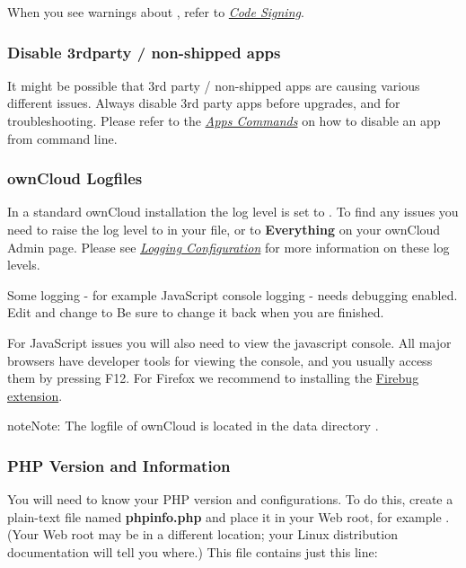 \documentclass[letterpaper,10pt,english]{sphinxmanual}
\begin{document}
When you see warnings about , refer to {\hyperref[issues/code_signing::doc]{\emph{Code Signing}}}.


\subsubsection{Disable 3rdparty / non-shipped apps}
\label{issues/general_troubleshooting:disable-3rdparty-non-shipped-apps}
It might be possible that 3rd party / non-shipped apps are causing various
different issues. Always disable 3rd party apps before upgrades, and for
troubleshooting. Please refer to the {\hyperref[configuration_server/occ_command:apps-commands-label]{\emph{Apps Commands}}} on how
to disable an app from command line.


\subsubsection{ownCloud Logfiles}
\label{issues/general_troubleshooting:owncloud-logfiles}
In a standard ownCloud installation the log level is set to . To find
any issues you need to raise the log level to  in your 
file, or to \textbf{Everything} on your ownCloud Admin page. Please see
{\hyperref[configuration_server/logging_configuration::doc]{\emph{Logging Configuration}}} for more information on
these log levels.

Some logging - for example JavaScript console logging - needs debugging
enabled. Edit  and change  to
 Be sure to change it back when you are finished.

For JavaScript issues you will also need to view the javascript console. All
major browsers have developer tools for viewing the console, and you
usually access them by pressing F12. For Firefox we recommend to installing
the \href{https://getfirebug.com/}{Firebug extension}.

\begin{notice}{note}{Note:}
The logfile of ownCloud is located in the data directory
.
\end{notice}


\subsubsection{PHP Version and Information}
\label{issues/general_troubleshooting:label-phpinfo}\label{issues/general_troubleshooting:php-version-and-information}
You will need to know your PHP version and configurations. To do this, create a
plain-text file named \textbf{phpinfo.php} and place it in your Web root, for
example . (Your Web root may be in a different
location; your Linux distribution documentation will tell you where.) This file
contains just this line:
\end{document}
